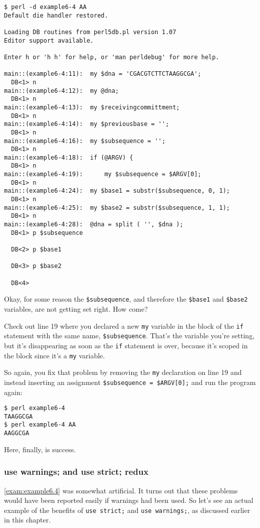 \begin{lstlisting}
$ perl -d example6-4 AA
Default die handler restored.

Loading DB routines from perl5db.pl version 1.07
Editor support available.

Enter h or 'h h' for help, or 'man perldebug' for more help.

main::(example6-4:11):	my $dna = 'CGACGTCTTCTAAGGCGA';
  DB<1> n
main::(example6-4:12):	my @dna;
  DB<1> n
main::(example6-4:13):	my $receivingcommittment;
  DB<1> n
main::(example6-4:14):	my $previousbase = ''; 
  DB<1> n
main::(example6-4:16):	my $subsequence = '';
  DB<1> n
main::(example6-4:18):	if (@ARGV) {
  DB<1> n
main::(example6-4:19):	    my $subsequence = $ARGV[0];
  DB<1> n
main::(example6-4:24):	my $base1 = substr($subsequence, 0, 1);
  DB<1> n
main::(example6-4:25):	my $base2 = substr($subsequence, 1, 1);
  DB<1> n
main::(example6-4:28):	@dna = split ( '', $dna );
  DB<1> p $subsequence

  DB<2> p $base1

  DB<3> p $base2

  DB<4> 
\end{lstlisting}

Okay, for some reason the \verb|$subsequence|, and therefore the \verb|$base1| and \verb|$base2| variables, are not getting set right. How come?

Check out line 19 where you declared a new \verb|my| variable in the block of the \verb|if| statement with the same name, \verb|$subsequence|. That's the variable you're setting, but it's disappearing as soon as the \verb|if| statement is over, because it's scoped in the block since it's a \verb|my| variable.

So again, you fix that problem by removing the \verb|my| declaration on line 19 and instead inserting an assignment \verb|$subsequence = $ARGV[0];| and run the program again:

\begin{lstlisting}
$ perl example6-4
TAAGGCGA
$ perl example6-4 AA
AAGGCGA 
\end{lstlisting}

Here, finally, is success.

\subsubsection{use warnings; and use strict; redux}
\autoref{exam:example6.4} was somewhat artificial. It turns out that these problems would have been reported easily if warnings had been used. So let's see an actual example of the benefits of \verb|use strict;| and \verb|use warnings;|, as discussed earlier in this chapter.

